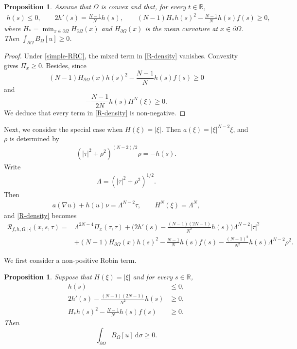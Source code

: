 \documentclass[reqno, 11pt]{amsart} %
\numberwithin{equation}{section}
\newtheorem{prop}[thm]{Proposition}
\theoremstyle{definition}
\newcommand{\pa}{\partial}
\newcommand{\R}{\mathbb{R}}
\newcommand{\calR}{\mathcal{R}}
\begin{document}
\begin{prop}\label{cor:simple-RRC}
Assume that $\Omega$ is convex and that, for every $t\in\R$,
\begin{align}\label{simple-RRC}
       h(s)\le0,\qquad 2h'(s)=\frac{N-1}{N} h(s),
       \qquad (N-1)H_*h(s)^2-\frac{N-1}{N} h(s)f(s)\ge0,
\end{align}
where $H_* = \min_{x\in\partial\Omega}H_{\pa \Omega}(x)$ and $H_{\pa \Omega}(x)$ is the mean curvature at $x \in \pa \Omega$. Then $\int_{\pa \Omega} B_{\Omega}[u] \geq 0$.
\end{prop}

\begin{proof}
Under \eqref{simple-RRC}, the mixed term in \eqref{R-density} vanishes. Convexity gives $\Pi_x \ge 0$. Besides, since $$(N-1)H_{\pa \Omega}(x) h(s)^2-\frac{N-1}{N} h(s)f(s)\ge0$$ and $$-\frac{N-1}{2N}h(s)H^N(\xi)\ge0.$$ We deduce that every term in \eqref{R-density} is non-negative.
\end{proof}

Next, we consider the special case when $H(\xi)=|\xi|$. Then $a(\xi)=|\xi|^{N-2}\xi$, and $\rho$ is determined by
\begin{align}\label{rho-isotropic}
       (|\tau|^2+\rho^2)^{(N-2)/2}\rho=-h(s).
\end{align}
Write
\begin{align*}
       \Lambda=(|\tau|^2+\rho^2)^{1/2}.
\end{align*}
Then
\begin{align*}
       a(\nabla u) + h(u) \nu =\Lambda^{N-2}\tau,
       \qquad H^N (\xi)=\Lambda^N,
\end{align*}
and \eqref{R-density} becomes
\begin{align}\label{isotropic-RRC}
    \calR_{f,h,\Omega,|\cdot|}(x,s,\tau) = &\Lambda^{2N-4}\Pi_x(\tau,\tau) + \bigg(2h'(s)- \frac{(N-1)(2N-1)}{N^2} h(s)\bigg) \Lambda^{N-2} |\tau|^2\nonumber\\
    & + (N-1)H_{\pa \Omega}(x)h(s)^2- \frac{N-1}{N}h(s)f(s) - \frac{(N-1)^2}{N^2} h(s)\Lambda^{N-2}\rho^2.
\end{align}

We first consider a non-positive Robin term.
\begin{prop}\label{prop:isotropic-negative-h}
 Suppose that $H(\xi)=|\xi|$ and for every $s\in \R$,
\begin{align}\label{negative-h-conditions}
       h(s)&\le0,\nonumber\\
       2h'(s)- \frac{(N-1)(2N-1)}{N^2} h(s)&\ge0,\\
       H_*h(s)^2- \frac{N-1}{N} h(s)f(s)&\ge0.\nonumber
\end{align}
Then $$\int_{\pa \Omega} B_{\Omega}[u] \ \text{d} \sigma \geq 0.$$
\end{prop}
\end{document}
